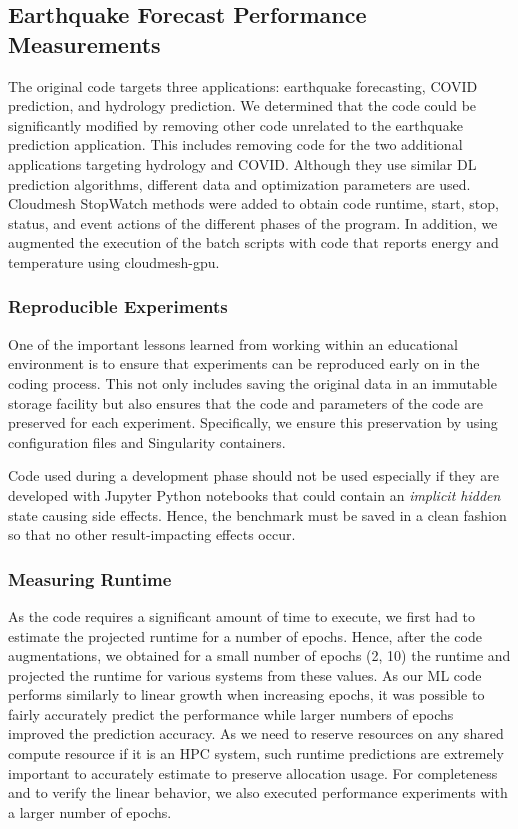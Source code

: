 \documentclass[utf8]{FrontiersinVancouver} %
\begin{document}
\subsection{Earthquake Forecast Performance Measurements}
\label{sec:perf-main}

The original code targets three applications: earthquake forecasting, COVID prediction, and hydrology prediction. We determined that the code could be significantly modified by removing other code unrelated to the earthquake prediction application. This includes removing code for the two additional applications targeting hydrology and COVID. Although they use similar DL prediction algorithms, different data and optimization parameters are used. Cloudmesh StopWatch methods were added to obtain code runtime, start, stop, status, and event actions of the different phases of the program. In addition, we augmented the execution of the batch scripts with code that reports energy and temperature using cloudmesh-gpu.


\subsubsection{Reproducible Experiments}

One of the important lessons learned from working within an educational environment is to ensure that experiments can be reproduced early on in the coding process. This not only includes saving the original data in an immutable storage facility but also ensures that the code and parameters of the code are preserved for each experiment. Specifically, we ensure this preservation by using configuration files and Singularity containers. 

Code used during a development phase should not be used especially if they are developed with Jupyter Python notebooks that could contain an {\em implicit
  hidden} state causing side effects. Hence, the benchmark 
must be saved in a clean fashion so that no other result-impacting
effects occur.

\subsubsection{Measuring Runtime}
\label{sec:perf-runtime}

As the code requires a significant amount of time to execute, we first had to estimate the projected runtime for a number of epochs. Hence, after the code augmentations, we obtained for a small number of epochs (2, 10) the runtime and projected the runtime for various systems from these values.  As our ML code performs similarly to linear growth when increasing epochs, it was possible to fairly accurately predict the performance while larger numbers of epochs improved the prediction accuracy. As we need to reserve resources on any shared compute resource if it is an HPC system, such runtime predictions are extremely important to accurately estimate to preserve allocation usage. For completeness and to verify the linear behavior, we also executed performance experiments with a larger number of epochs.
\end{document}
